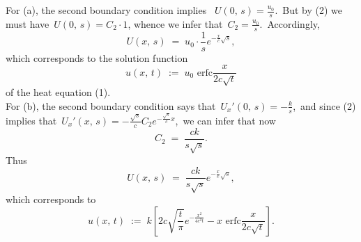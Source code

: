 \documentclass[12pt]{article}
\theoremstyle{definition}
\begin{document}
For (a), the second boundary condition implies \, $\displaystyle U(0,\,s) = \frac{u_0}{s}$.\, But by (2) we must have\, $U(0,\,s) = C_2\!\cdot\!1$, whence we infer that\, $\displaystyle C_2 = \frac{u_0}{s}$.\, Accordingly, 
$$U(x,\,s) \;=\; u_0\cdot\frac{1}{s}e^{-\frac{x}{c}\sqrt{s}},$$
which corresponds to the solution function
$$u(x,\,t) \;:=\; u_0\mbox{ erfc}\frac{x}{2c\sqrt{t}}$$
of the heat equation (1).\\

For (b), the second boundary condition says that\, $\displaystyle U_x'(0,\,s) = -\frac{k}{s}$,\, and since (2) implies that\, 
$U_x'(x,\,s) =-\frac{\sqrt{s}}{c}C_2e^{-\frac{\sqrt{s}}{c}x}$,\, we can infer that now\, 
$$C_2 \;=\; \frac{ck}{s\sqrt{s}}.$$
Thus
$$U(x,\,s) \;=\; \frac{ck}{s\sqrt{s}}e^{-\frac{x}{c}\sqrt{s}},$$
which corresponds to
$$u(x,\,t) \;:=\; k\left[2c\sqrt{\frac{t}{\pi}}e^{-\frac{x^2}{4c^2t}}-x\mbox{ erfc}\frac{x}{2c\sqrt{t}}\right]\!.$$\\





\end{document}
